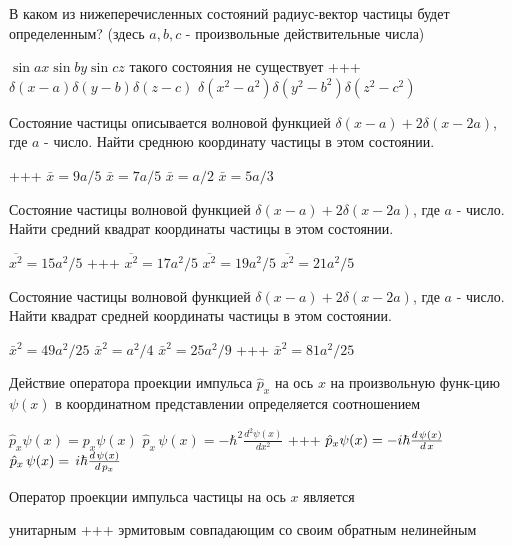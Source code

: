 \documentclass[11pt,a4paper]{exam}
\newcommand{\rightchoice}{\choice +++ }
\begin{document}
\begin{questions}
\question В каком из нижеперечисленных состояний радиус-вектор частицы будет определенным? (здесь $a,b,c$ - произвольные действительные числа)
\begin{choices}
\choice $\sin ax\sin by\sin cz$           
\choice такого состояния не существует
\rightchoice $\delta (x - a)\delta (y - b)\delta (z - c)$        
\choice $\delta ({x^2} - {a^2})\delta ({y^2} - {b^2})\delta ({z^2} - {c^2})$
\end{choices}

\question Состояние частицы описывается волновой функцией $\delta (x - a) + 2\delta (x - 2a)$, где $a$ - число. Найти среднюю координату частицы в этом состоянии.
\begin{choices}
\rightchoice $\bar x = 9a/5$    
\choice $\bar x = 7a/5$    
\choice $\bar x = a/2$     
\choice $\bar x = 5a/3$
\end{choices}

\question Состояние частицы волновой функцией $\delta (x - a) + 2\delta (x - 2a)$, где $a$ - число. Найти средний квадрат координаты частицы в этом состоянии.
\begin{choices}
\choice $\overline {{x^2}}  = 15{a^2}/5$  
\rightchoice $\overline {{x^2}}  = 17{a^2}/5$  
\choice $\overline {{x^2}}  = 19{a^2}/5$  
\choice $\overline {{x^2}}  = 21{a^2}/5$
\end{choices}

\question Состояние частицы волновой функцией $\delta (x - a) + 2\delta (x - 2a)$, где $a$ - число. Найти квадрат средней координаты частицы в этом состоянии.
\begin{choices}
\choice ${\bar x^2} = 49{a^2}/25$   
\choice ${\bar x^2} = {a^2}/4$      
\choice ${\bar x^2} = 25{a^2}/9$ 
\rightchoice ${\bar x^2} = 81{a^2}/25$
\end{choices}

\question Действие оператора проекции импульса ${\hat p_x}$ на ось $x$ на произвольную функ-цию $\psi (x)$ в координатном представлении определяется соотношением
\begin{choices}
\choice ${\hat p_x}\psi (x) = {p_x}\psi (x)$       
\choice ${\hat p_x}\,\psi (x) =  - {\hbar ^2}\frac{{{d^2}\psi (x)}}{{d{x^2}}}$
\rightchoice ${\hat p_x}\psi (x) =  - i\hbar \frac{{d{\kern 1pt} \psi (x)}}{{d{\kern 1pt} x}}$    
\choice ${\hat p_x}\,\psi (x) = \,i\hbar \frac{{d{\kern 1pt} \psi (x)}}{{d{\kern 1pt} {p_x}}}$
\end{choices}

\question Оператор проекции импульса частицы на ось $x$ является
\begin{choices}
\choice унитарным             
\rightchoice эрмитовым
\choice совпадающим со своим обратным     
\choice нелинейным 
\end{choices}


\end{questions}
\end{document}
